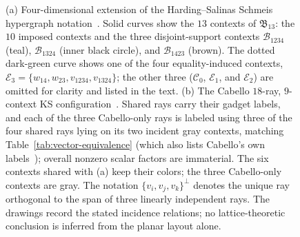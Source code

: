 \documentclass[%
  reprint,
  superscriptaddress,
  showkeys,
  amsmath,amssymb,
  aps,pra,
  longbibliography,
  floatfix,
  x11names
]{revtex4-2}
\begin{document}
\begin{figure}[ht]
\begin{tabular}{ccc}

\end{tabular}
\caption{
(a) Four-dimensional extension of the Harding--Salinas Schmeis hypergraph notation~\cite{harding2025remarksIJTP}.  Solid curves show the $13$ contexts of $\mathfrak{B}_{13}$: the $10$ imposed contexts and the three disjoint-support contexts $\mathcal{B}_{1234}$ (teal), $\mathcal{B}_{1324}$ (inner black circle), and $\mathcal{B}_{1423}$ (brown).  The dotted dark-green curve shows one of the four equality-induced contexts, $\mathcal{E}_3=\{w_{14},w_{23},v_{1234},v_{1324}\}$; the other three ($\mathcal{C}_0$, $\mathcal{E}_1$, and $\mathcal{E}_2$) are omitted for clarity and listed in the text.  (b) The Cabello $18$-ray, $9$-context KS configuration~\cite{cabello-96}.  Shared rays carry their gadget labels, and each of the three Cabello-only rays is labeled using three of the four shared rays lying on its two incident gray contexts, matching Table~\ref{tab:vector-equivalence} (which also lists Cabello's own labels~\cite{cabello:210401}); overall nonzero scalar factors are immaterial.  The six contexts shared with (a) keep their colors; the three Cabello-only contexts are gray.  The notation $\{v_i,v_j,v_k\}^{\perp}$ denotes the unique ray orthogonal to the span of three linearly independent rays.  The drawings record the stated incidence relations; no lattice-theoretic conclusion is inferred from the planar layout alone.
}
\label{fig:peres}
\end{figure}
\end{document}
